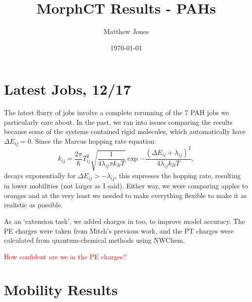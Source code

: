 \documentclass[12pt]{article}
\title{MorphCT Results - PAHs}
\author{Matthew Jones}
\date{\today}
\begin{document}
\maketitle


\section{Latest Jobs, 12/17}


The latest flurry of jobs involve a complete rerunning of the 7 PAH jobs we particularly care about.
In the past, we ran into issues comparing the results because some of the systems contained rigid molecules, which automatically have $\Delta E_{ij} = 0$.
Since the Marcus hopping rate equation:
\begin{equation}
    k_{ij} = \frac{2 \pi}{\hbar} T_{ij}^{2} \sqrt{\frac{1}{4 \lambda_{ij} \pi k_{B} T}} \exp{-\frac{\left( \Delta E_{ij} + \lambda_{ij} \right)^{2}}{4 \lambda_{ij} k_{B} T}},
\end{equation}
decays exponentially for $\Delta E_{ij} > - \lambda_{ij}$, this supresses the hopping rate, resulting in lower mobilities (not larger as I said).
Either way, we were comparing apples to oranges and at the very least we needed to make everything flexible to make it as realistic as possible.

As an `extension task', we added charges in too, to improve model accuracy.
The PE charges were taken from Mitch's previous work, and the PT charges were calculated from quantum-chemical methods using NWChem.

\textcolor{red}{How confident are we in the PE charges?}


\section{Mobility Results}
\end{document}
